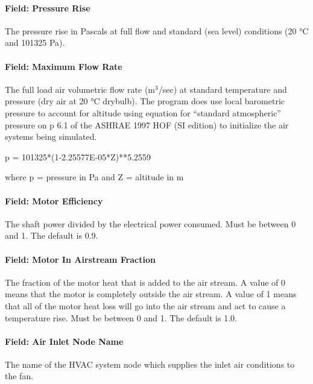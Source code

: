 \paragraph{Field: Pressure Rise}\label{field-pressure-rise}

The pressure rise in Pascals at full flow and standard (sea level) conditions (20 °C and 101325 Pa).

\paragraph{Field: Maximum Flow Rate}\label{field-maximum-flow-rate-000}

The full load air volumetric flow rate (m\(^{3}\)/sec) at standard temperature and pressure (dry air at 20 °C drybulb). The program does use local barometric pressure to account for altitude using equation for ``standard atmospheric'' pressure on p 6.1 of the ASHRAE 1997 HOF (SI edition) to initialize the air systems being simulated.

p = 101325*(1-2.25577E-05*Z)**5.2559

where p = pressure in Pa and Z = altitude in m

\paragraph{Field: Motor Efficiency}\label{field-motor-efficiency}

The shaft power divided by the electrical power consumed. Must be between 0 and 1. The default is 0.9.

\paragraph{Field: Motor In Airstream Fraction}\label{field-motor-in-airstream-fraction}

The fraction of the motor heat that is added to the air stream. A value of 0 means that the motor is completely outside the air stream. A value of 1 means that all of the motor heat loss will go into the air stream and act to cause a temperature rise. Must be between 0 and 1. The default is 1.0.

\paragraph{Field: Air Inlet Node Name}\label{field-air-inlet-node-name-002}

The name of the HVAC system node which supplies the inlet air conditions to the fan.

